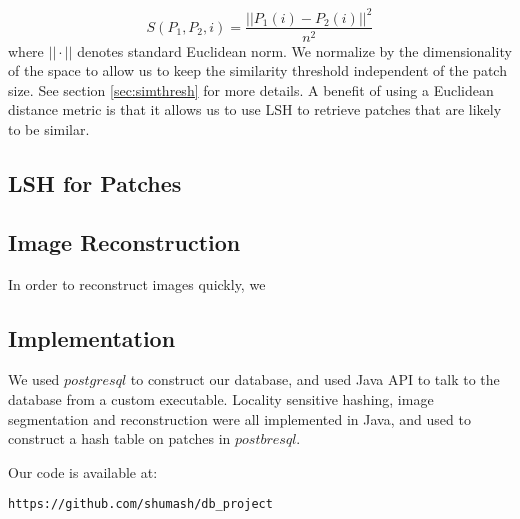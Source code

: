 \begin{displaymath}
S(P_1, P_2, i) = \frac{||P_1(i) - P_2(i)||^2}{n^2}
\end{displaymath}
where $||\cdot||$ denotes standard Euclidean norm.
We normalize by the dimensionality of the space to allow us to keep the
similarity threshold independent of the patch size. See section \ref{sec:simthresh} for more details.  A benefit of using a Euclidean distance metric is that it allows us to use LSH to retrieve patches that are likely to be similar.

\subsection{LSH for Patches}\label{ssec:lsh}

\subsection{Image Reconstruction}\label{ssec:reconst}

In order to reconstruct images quickly, we

\subsection{Implementation}\label{ssec:impl}
We used $postgresql$ to construct our database, and used
Java API to talk to the database from a custom executable. Locality
sensitive hashing, image segmentation and reconstruction were
all implemented in Java, and used to construct a hash table
on patches in $postbresql$.

Our code is available at:
\begin{verbatim}
https://github.com/shumash/db_project
\end{verbatim}
